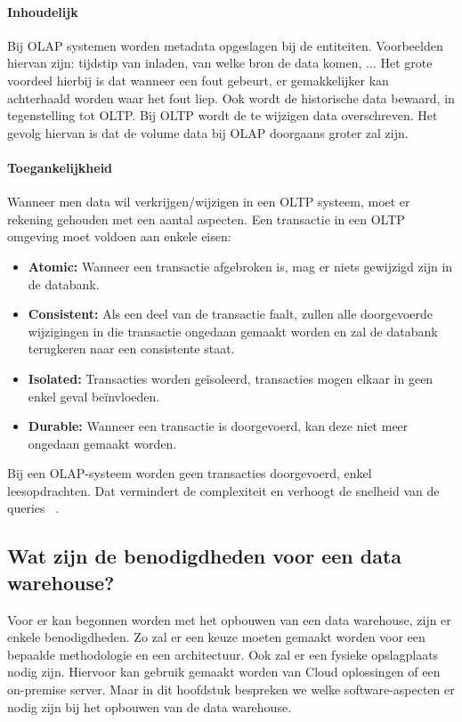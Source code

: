 \paragraph{Inhoudelijk}
Bij OLAP systemen worden metadata opgeslagen bij de entiteiten. Voorbeelden hiervan zijn: tijdstip van inladen, van welke bron de data komen, ... Het grote voordeel hierbij is dat wanneer een fout gebeurt, er gemakkelijker kan achterhaald worden waar het fout liep. Ook wordt de historische data bewaard, in tegenstelling tot OLTP. Bij OLTP wordt de te wijzigen data overschreven. Het gevolg hiervan is dat de volume data bij OLAP doorgaans groter zal zijn.

\paragraph{Toegankelijkheid}
Wanneer men data wil verkrijgen/wijzigen in een OLTP systeem, moet er rekening gehouden met een aantal aspecten. Een transactie in een OLTP omgeving moet voldoen aan enkele eisen:
\begin{itemize}
	\item \textbf{Atomic:} Wanneer een transactie afgebroken is, mag er niets gewijzigd zijn in de databank.
	\item \textbf{Consistent:} Als een deel van de transactie faalt, zullen alle doorgevoerde wijzigingen in die transactie ongedaan gemaakt worden en zal de databank terugkeren naar een consistente staat.
	\item \textbf{Isolated:} Transacties worden geïsoleerd, transacties mogen elkaar in geen enkel geval beïnvloeden.
	\item \textbf{Durable:} Wanneer een transactie is doorgevoerd, kan deze niet meer ongedaan gemaakt worden.
\end{itemize}  

Bij een OLAP-systeem worden geen transacties doorgevoerd, enkel leesopdrachten. Dat vermindert de complexiteit en verhoogt de snelheid van de queries ~\autocite{Satyanarayana2010}. 

\subsection{Wat zijn de benodigdheden voor een data warehouse?}
Voor er kan begonnen worden met het opbouwen van een data warehouse, zijn er enkele benodigdheden. Zo zal er een keuze moeten gemaakt worden voor een bepaalde methodologie en een architectuur. Ook zal er een fysieke opslagplaats nodig zijn. Hiervoor kan gebruik gemaakt worden van Cloud oplossingen of een on-premise server. Maar in dit hoofdstuk bespreken we welke software-aspecten er nodig zijn bij het opbouwen van de data warehouse.

